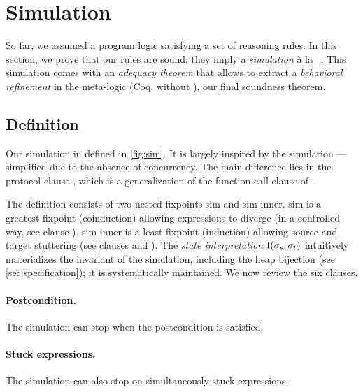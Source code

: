 \section{Simulation}
\label{sec:simulation}



So far, we assumed a program logic satisfying a set of reasoning rules.
In this section, we prove that our rules are sound: they imply a \emph{simulation} à la \Simuliris~\citep*{simuliris-2022}.
This simulation comes with an \emph{adequacy theorem} that allows to extract a \emph{behavioral refinement} in the meta-logic (Coq, without \Iris), our final soundness theorem.

\subsection{Definition}

Our simulation in defined in \cref{fig:sim}.
It is largely inspired by the \Simuliris simulation --- simplified due to the absence of concurrency.
The main difference lies in the protocol clause , which is a generalization of the function call clause of \Simuliris.

\newcommand{\iSimGfp}{\textcolor{\iSimGfpColor}{sim}\xspace}
\newcommand{\iSimLfp}{\textcolor{\iSimLfpColor}{sim-inner}\xspace}

The definition consists of two nested fixpoints \iSimGfp and \iSimLfp.
\iSimGfp is a greatest fixpoint (coinduction) allowing expressions to diverge (in a controlled way, see clause ).
\iSimLfp is a least fixpoint (induction) allowing source and target stuttering (see clauses  and ).
The \emph{state interpretation} $\mathrm{I} (\datalangState_s, \datalangState_t)$ intuitively materializes the invariant of the simulation, including the heap bijection (see \cref{sec:specification}); it is systematically maintained.
We now review the six clauses.

\paragraph{ Postcondition.}
The simulation can stop when the postcondition is satisfied.

\paragraph{ Stuck expressions.}
The simulation can also stop on simultaneously stuck expressions.

